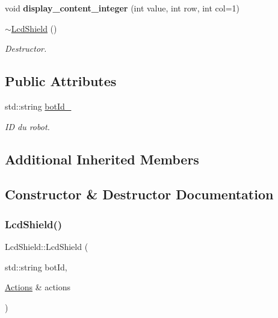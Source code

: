 \begin{DoxyCompactItemize}
\item 
\mbox{\label{classLcdShield_a130485931e874002f89c7d9565109a46}} 
void {\bfseries display\+\_\+content\+\_\+integer} (int value, int row, int col=1)
\item 
\mbox{\label{classLcdShield_a5db589354f6ac79f13b1a48e57535f69}} 
\hyperlink{classLcdShield_a5db589354f6ac79f13b1a48e57535f69}{$\sim$\+Lcd\+Shield} ()
\begin{DoxyCompactList}\small\item\em Destructor. \end{DoxyCompactList}\end{DoxyCompactItemize}
\subsection*{Public Attributes}
\begin{DoxyCompactItemize}
\item 
\mbox{\label{classLcdShield_a805bfac396abf113077b668f23961df4}} 
std\+::string \hyperlink{classLcdShield_a805bfac396abf113077b668f23961df4}{bot\+Id\+\_\+}
\begin{DoxyCompactList}\small\item\em ID du robot. \end{DoxyCompactList}\end{DoxyCompactItemize}
\subsection*{Additional Inherited Members}


\subsection{Constructor \& Destructor Documentation}
\mbox{\label{classLcdShield_adf69aee9cba76742905ec98b0c3902d5}} 
\subsubsection{\texorpdfstring{Lcd\+Shield()}{LcdShield()}}
{\footnotesize\ttfamily Lcd\+Shield\+::\+Lcd\+Shield (\begin{DoxyParamCaption}\item[{std\+::string}]{bot\+Id,  }\item[{\hyperlink{classActions}{Actions} \&}]{actions }\end{DoxyParamCaption})}



